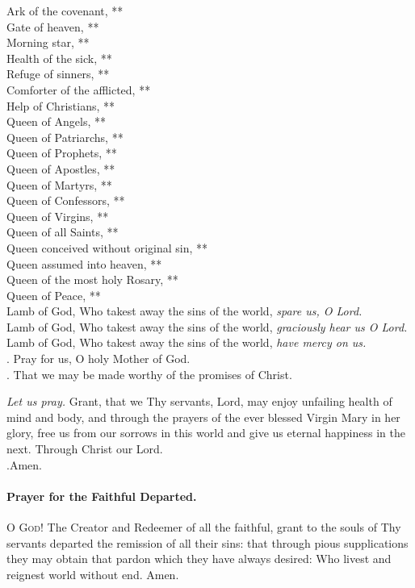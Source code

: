 \documentclass{article}
\makeatletter
\DeclareRobustCommand{\versicle}{\textbf{\vers@resp{-0.1em}{V}}}
\DeclareRobustCommand{\response}{\textbf{\vers@resp{0pt}{R}}}
\newcommand{\vers@resp@sym}{\raisebox{0.2ex}{\rotatebox[origin=c]{-20}{$\m@th\rceil$}}}
\newcommand{\vers@resp}[2]{%
  {\ooalign{\hidewidth\kern#1\vers@resp@sym\hidewidth\cr#2\cr}}%
}
\makeatother
\begin{document}
\begin{multicols}{3}
\begin{FlushLeft}
Ark of the covenant, **\\
Gate of heaven, **\\
Morning star, **\\
Health of the sick, **\\
Refuge of sinners, **\\
Comforter of the afflicted, **\\
Help of Christians, **\\
Queen of Angels, **\\
Queen of Patriarchs, **\\
Queen of Prophets, **\\
Queen of Apostles, **\\
Queen of Martyrs, **\\
Queen of Confessors, **\\
Queen of Virgins, **\\
Queen of all Saints, **\\
Queen conceived without original sin, **\\
Queen assumed into heaven, **\\
Queen of the most holy Rosary, **\\
Queen of Peace, **\\
Lamb of God, Who takest away the sins of the world, \textit{spare us, O Lord.}\\
Lamb of God, Who takest away the sins of the world, \textit{graciously hear us O Lord.}\\
Lamb of God, Who takest away the sins of the world, \textit{have mercy on us.}\\

\versicle. Pray for us, O holy Mother of God.\\
\response. That we may be made worthy of the promises of Christ.
\end{FlushLeft}

\textit{Let us pray.} Grant, that we Thy servants, Lord, may enjoy unfailing
health of mind and body, and through the prayers of the ever blessed Virgin Mary in her glory,
free us from our sorrows in this world and give us eternal happiness in the next.
Through Christ our Lord.\\
\response.Amen.

\paragraph{Prayer for the Faithful Departed.}
\textsc{O God!} The Creator and Redeemer of all the faithful, grant to the souls of Thy servants
departed the remission of all their sins: that through pious supplications they may obtain that pardon
which they have always desired: Who livest and reignest world without end.  Amen.


\end{multicols}
\end{document}
